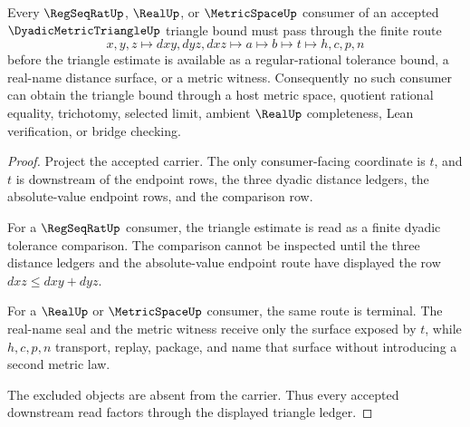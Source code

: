 \begin{theorem}
\label{thm:dyadic-metric-triangle-regseqrat-handoff}
Every $\RegSeqRatUp$, $\RealUp$, or $\MetricSpaceUp$ consumer of an accepted $\DyadicMetricTriangleUp$ triangle bound must pass through the finite route
$$
x,y,z \longmapsto dxy,dyz,dxz \longmapsto a \longmapsto b \longmapsto t \longmapsto h,c,p,n
$$
before the triangle estimate is available as a regular-rational tolerance bound, a real-name distance surface, or a metric witness. Consequently no such consumer can obtain the triangle bound through a host metric space, quotient rational equality, trichotomy, selected limit, ambient $\RealUp$ completeness, Lean verification, or bridge checking.
\end{theorem}
\begin{proof}
Project the accepted carrier. The only consumer-facing coordinate is $t$, and $t$ is downstream of the endpoint rows, the three dyadic distance ledgers, the absolute-value endpoint rows, and the comparison row.

For a $\RegSeqRatUp$ consumer, the triangle estimate is read as a finite dyadic tolerance comparison. The comparison cannot be inspected until the three distance ledgers and the absolute-value endpoint route have displayed the row $dxz \leq dxy + dyz$.

For a $\RealUp$ or $\MetricSpaceUp$ consumer, the same route is terminal. The real-name seal and the metric witness receive only the surface exposed by $t$, while $h,c,p,n$ transport, replay, package, and name that surface without introducing a second metric law.

The excluded objects are absent from the carrier. Thus every accepted downstream read factors through the displayed triangle ledger.
\end{proof}


